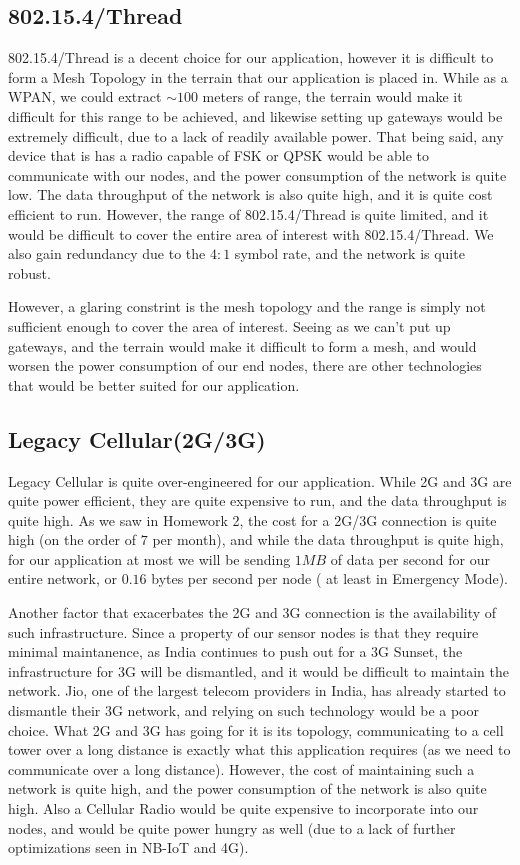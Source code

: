 \subsection{802.15.4/Thread}
802.15.4/Thread is a decent choice for our application, however it is difficult to form a Mesh Topology in the terrain that our application is placed in. While as a WPAN, we could extract $\sim 100$ meters of range, the terrain would make it difficult for this range to be achieved, and likewise setting up gateways would be extremely difficult, due to a lack of readily available power. That being said, any device that is has a radio capable of FSK or QPSK would be able to communicate with our nodes, and the power consumption of the network is quite low. The data throughput of the network is also quite high, and it is quite cost efficient to run. However, the range of 802.15.4/Thread is quite limited, and it would be difficult to cover the entire area of interest with 802.15.4/Thread. We also gain redundancy due to the $4:1$ symbol rate, and the network is quite robust. 

However, a glaring constrint is the mesh topology and the range is simply not sufficient enough to cover the area of interest. Seeing as we can't put up gateways, and the terrain would make it difficult to form a mesh, and would worsen the power consumption of our end nodes, there are other technologies that would be better suited for our application.
\subsection{Legacy Cellular(2G/3G)}
Legacy Cellular is quite over-engineered for our application. While 2G and 3G are quite power efficient, they are quite expensive to run, and the data throughput is quite high. As we saw in Homework 2, the cost for a 2G/3G connection is quite high (on the order of $7$ per month), and while the data throughput is quite high, for our application at most we will be sending $1 MB$ of data per second for our entire network, or $0.16$ bytes per second per node ( at least in Emergency Mode). 

Another factor that exacerbates the 2G and 3G connection is the availability of such infrastructure. Since a property of our sensor nodes is that they require minimal maintanence, as India continues to push out for a 3G Sunset, the infrastructure for 3G will be dismantled, and it would be difficult to maintain the network. Jio, one of the largest telecom providers in India, has already started to dismantle their 3G network, and relying on such technology would be a poor choice\cite{3gsunset}. What 2G and 3G has going for it is its topology, communicating to a cell tower over a long distance is exactly what this application requires (as we need to communicate over a long distance). However, the cost of maintaining such a network is quite high, and the power consumption of the network is also quite high. Also a Cellular Radio would be quite expensive to incorporate into our nodes, and would be quite power hungry as well (due to a lack of further optimizations seen in NB-IoT and 4G).


